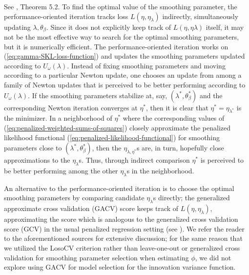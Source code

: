 \noindent
See \cite{gu2013smoothing}, Theorem 5.2. To find the optimal value of the smoothing parameter, the performance-oriented iteration tracks loss $L\left(\eta, \eta_\lambda \right)$ indirectly, simultaneously updating $\lambda, \theta_\beta$. Since it does not explicitly keep track of $L\left(\eta, \eta\lambda\right)$ itself, it may not be the most effective way to search for the optimal smoothing parameters, but it is numerically efficient. The performance-oriented iteration works on (\ref{eq:gamma-SKL-loss-function}) and updates the smoothing parameters updated according to $U_\omega\left( \lambda \right)$. Instead of fixing smoothing parameters and moving according to a particular Newton update, one chooses an update from among a family of Newton updates that is perceived to be better performing according to $U_\omega\left(\lambda\right)$. If the smoothing parameters stabilize at, say, $\left(\lambda^*,\theta^*_\beta\right)$ and the corresponding Newton iteration converges at $\eta^*$, then it is clear that $\eta^* = \eta_{\lambda^*}$ is the minimizer. In a neighborhood of $\eta^*$ where the corresponding values of (\ref{eq:penalized-weighted-sums-of-squares}) closely approximate the penalized likelihood functional (\ref{eq:penalized-likelihood-functional}) for smoothing parameters close to $\left( \lambda^*, \theta^*_\beta \right)$, then the $\eta_{\lambda, \eta^*}$s are, in turn, hopefully close approximations to the $\eta_\lambda$s. Thus, through indirect comparison $\eta^*$ is perceived to be better performing among the other $\eta_\lambda$s in the neighborhood.

\bigskip

An alternative to the performance-oriented iteration is to choose the optimal smoothing parameters by comparing candidate $\eta_\lambda$s directly; the generalized approximate cross validation (GACV) score \cite{xiang1996generalized} keeps track of $L\left(\eta, \eta_\lambda\right)$, approximating the score which is analogous to the generalized cross validation score (GCV) in the usual penalized regression setting (see \citep{wahba1990spline}). We refer the reader to the aforementioned sources for extensive discussion; for the same reason that we utilized the LosoCV criterion rather than leave-one-out or generalized cross validation for smoothing parameter selection when estimating $\phi$, we did not explore using GACV for model selection for the innovation variance function.


%
%
%
